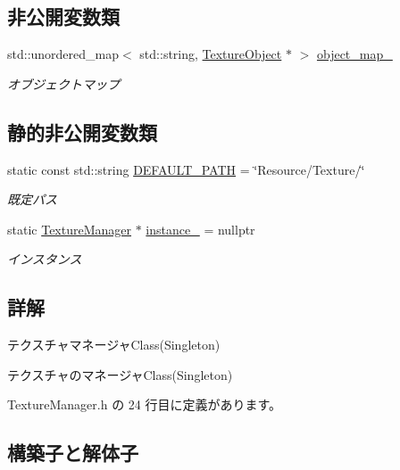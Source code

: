 \subsection*{非公開変数類}
\begin{DoxyCompactItemize}
\item 
std\+::unordered\+\_\+map$<$ std\+::string, \mbox{\hyperlink{class_texture_object}{Texture\+Object}} $\ast$ $>$ \mbox{\hyperlink{class_texture_manager_a105e7936953e0907fc6a7b9c9734a01a}{object\+\_\+map\+\_\+}}
\begin{DoxyCompactList}\small\item\em オブジェクトマップ \end{DoxyCompactList}\end{DoxyCompactItemize}
\subsection*{静的非公開変数類}
\begin{DoxyCompactItemize}
\item 
static const std\+::string \mbox{\hyperlink{class_texture_manager_a7cdcbb47cf36d179ae88716210e7db65}{D\+E\+F\+A\+U\+L\+T\+\_\+\+P\+A\+TH}} = \char`\"{}Resource/Texture/\char`\"{}
\begin{DoxyCompactList}\small\item\em 既定パス \end{DoxyCompactList}\item 
static \mbox{\hyperlink{class_texture_manager}{Texture\+Manager}} $\ast$ \mbox{\hyperlink{class_texture_manager_ac52b2d7e39fd06b9571658025ae609a4}{instance\+\_\+}} = nullptr
\begin{DoxyCompactList}\small\item\em インスタンス \end{DoxyCompactList}\end{DoxyCompactItemize}


\subsection{詳解}
テクスチャマネージャ\+Class(\+Singleton) 

テクスチャのマネージャ\+Class(\+Singleton) 

 Texture\+Manager.\+h の 24 行目に定義があります。



\subsection{構築子と解体子}
\mbox{\label{class_texture_manager_ad76abb178b37cedf4514eb0154349935}} 
